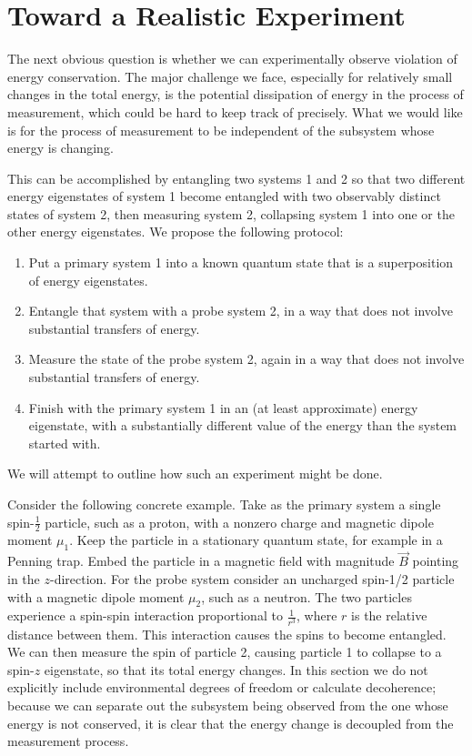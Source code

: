 \documentclass[12pt,aps,prd,onecolumn,nofootinbib,notitlepage]{revtex4-1}
\begin{document}
\section{Toward a Realistic Experiment}

The next obvious question is whether we can experimentally observe violation of energy conservation.
The major challenge we face, especially for relatively small changes in the total energy, is the potential dissipation of energy in the process of measurement, which could be hard to keep track of precisely.
What we would like is for the process of measurement to be independent of the subsystem whose energy is changing.

This can be accomplished by entangling two systems 1 and 2 so that two different energy eigenstates of system 1 become entangled with two observably distinct states of system 2, then measuring system 2, collapsing system 1 into one or the other energy eigenstates.
We propose the following protocol:
\begin{enumerate}
\item Put a primary system 1 into a known quantum state that is a superposition of energy eigenstates.
\item Entangle that system with a probe system 2, in a way that does not involve substantial transfers of energy.
\item Measure the state of the probe system 2, again in a way that does not involve substantial transfers of energy.
\item Finish with the primary system 1 in an (at least approximate) energy eigenstate, with a substantially different value of the energy than the system started with.
\end{enumerate}
We will attempt to outline how such an experiment might be done.

Consider the following concrete example.
Take as the primary system a single spin-$\frac{1}{2}$ particle, such as a proton, with a nonzero charge and magnetic dipole moment $\mu_1$.
Keep the particle in a stationary quantum state, for example in a Penning trap.
Embed the particle in a magnetic field with magnitude $\vec B$ pointing in the $z$-direction.
For the probe system consider an uncharged spin-1/2 particle with a magnetic dipole moment $\mu_2$, such as a neutron.
The two particles experience a spin-spin interaction proportional to $\frac{1}{r^3}$, where $r$ is the relative distance between them.
This interaction causes the spins to become entangled.
We can then measure the spin of particle 2, causing particle 1 to collapse to a spin-$z$ eigenstate, so that its total energy changes.
In this section we do not explicitly include environmental degrees of freedom or calculate decoherence; because we can separate out the subsystem being observed from the one whose energy is not conserved, it is clear that the energy change is decoupled from the measurement process.
\end{document}
